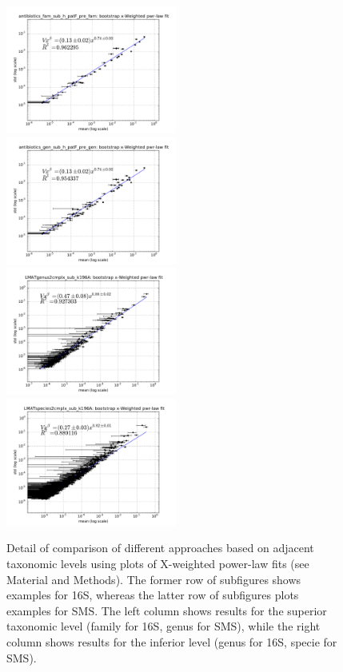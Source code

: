\begin{figure} 
  \includegraphics[width=0.5\textwidth]{results/taxalevel/xWb_fam_16S.pdf}
  \includegraphics[width=0.5\textwidth]{results/taxalevel/xWb_gen_16S.pdf}
  \includegraphics[width=0.5\textwidth]{results/taxalevel/xWb_gen_SMS.pdf}
  \includegraphics[width=0.5\textwidth]{results/taxalevel/xWb_spc_SMS.pdf}
\caption{Detail of comparison of different approaches based on adjacent taxonomic levels using plots of X-weighted power-law fits (see Material and Methods). The former row of subfigures shows examples for 16S, whereas the latter row of subfigures plots examples for SMS. The left column shows results for the superior taxonomic level (family for 16S, genus for SMS), while the right column shows results for the inferior level (genus for 16S, specie for SMS).}
\label{fig:taxlev2}
\end{figure}



